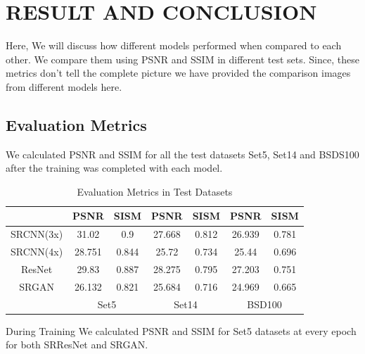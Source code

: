 \newpage
\section{RESULT AND CONCLUSION}
Here, We will discuss how different models performed when compared to each other. We compare them using PSNR and SSIM in different test sets. Since, these metrics don't tell the complete picture we have provided the comparison images from different models here.
\subsection{Evaluation Metrics}
We calculated PSNR and SSIM for all the test datasets Set5, Set14 and BSDS100 after the training was completed with each model.
\begin{table}[h]
    \centering
    \begin{tabular}{|c|c|c|c|c|c|c|}
    \hline
    &PSNR & SISM & PSNR & SISM & PSNR & SISM \\
    \hline
    SRCNN(3x)&31.02 & 0.9 & 27.668 & 0.812 & 26.939 & 0.781 \\
    \hline
    SRCNN(4x)&28.751 & 0.844 & 25.72 & 0.734 & 25.44 & 0.696 \\
    \hline
    ResNet&29.83 & 0.887 & 28.275 & 0.795 & 27.203 & 0.751 \\
    \hline
    SRGAN &26.132 & 0.821 &25.684 & 0.716 & 24.969 & 0.665 \\
    \hline
    & \multicolumn{2}{|c|}{Set5}& \multicolumn{2}{|c|}{Set14} & \multicolumn{2}{|c|}{BSD100} \\
    \hline
    \end{tabular}
    \caption{Evaluation Metrics in Test Datasets}
\end{table}
\clearpage
During Training We calculated PSNR and SSIM for Set5 datasets at every epoch for both SRResNet and SRGAN.
